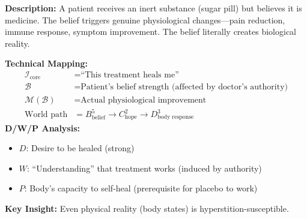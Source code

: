 \begin{tcolorbox}[colback=yellow!5!white,colframe=yellow!65!black,title=\textbf{Scenario 3: Placebo Effect (Medical Hyperstition)},breakable]

\textbf{Description:}
A patient receives an inert substance (sugar pill) but believes it is medicine. The belief triggers genuine physiological changes---pain reduction, immune response, symptom improvement. The belief literally creates biological reality.

\textbf{Technical Mapping:}
\begin{align*}
\mathcal{I}_{\text{core}} &= \text{``This treatment heals me''} \\
\mathcal{B} &= \text{Patient's belief strength (affected by doctor's authority)} \\
\mathcal{M}(\mathcal{B}) &= \text{Actual physiological improvement} \\
\text{World path} &= B^5_{\text{belief}} \to C^2_{\text{hope}} \to D^3_{\text{body response}}
\end{align*}
\textbf{D/W/P Analysis:}
\begin{itemize}
    \item $D$: Desire to be healed (strong)
    \item $W$: ``Understanding'' that treatment works (induced by authority)
    \item $P$: Body's capacity to self-heal (prerequisite for placebo to work)
\end{itemize}
\textbf{Key Insight:} Even physical reality (body states) is hyperstition-susceptible.

\end{tcolorbox}

